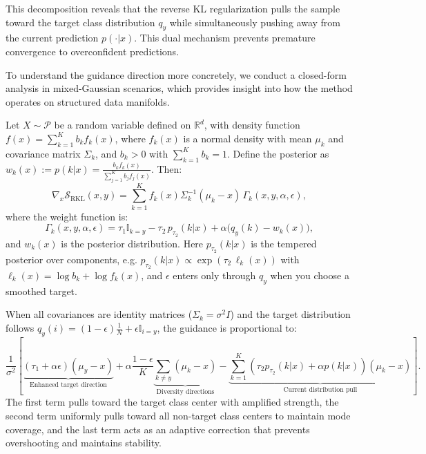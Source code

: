 \documentclass{article}
\begin{document}
This decomposition reveals that the reverse KL regularization pulls the sample toward the target class distribution $q_y$ while simultaneously pushing away from the current prediction $p(\cdot|x)$. This dual mechanism prevents premature convergence to overconfident predictions.

To understand the guidance direction more concretely, we conduct a closed-form analysis in mixed-Gaussian scenarios, which provides insight into how the method operates on structured data manifolds.

\begin{proposition}
\label{prop:gaussian_rkl}
Let $X \sim \mathcal{P}$ be a random variable defined on $\mathbb{R}^d$, with density function
$f(x) = \sum_{k=1}^K b_k f_k(x)$, where $f_k(x)$ is a normal density with mean $\mu_k$ and covariance matrix
$\Sigma_k$, and $b_k > 0$ with $\sum_{k=1}^K b_k = 1$.
Define the posterior as $w_k(x) := p(k|x)=\frac{b_k f_k(x)}{\sum_{j=1}^K b_j f_j(x)}$. Then:
\begin{equation}
\nabla_x \mathcal{S}_{\text{RKL}}(x, y) = \sum_{k=1}^K f_k(x)\Sigma_k^{-1}(\mu_k - x)\, \Gamma_k(x, y, \alpha, \epsilon),
\label{eq:gaussian_rkl}
\end{equation}
where the weight function is:
\begin{equation}
\Gamma_k(x, y, \alpha, \epsilon)
= \tau_1 \mathbb{I}_{k=y}
- \tau_2\, p_{\tau_2}(k|x)
+ \alpha\big(q_y(k) - w_k(x)\big),
\label{eq:gamma_weight}
\end{equation}
and 
$
w_k(x)
$ is the posterior distribution. Here $p_{\tau_2}(k|x)$ is the tempered posterior over components, e.g.
$p_{\tau_2}(k|x)\propto \exp(\tau_2\,\ell_k(x))$ with $\ell_k(x)=\log b_k+\log f_k(x)$,
and $\epsilon$ enters only through $q_y$ when you choose a smoothed target.
\end{proposition}

\begin{remark}
\label{rem:identity_covariance}
When all covariances are identity matrices ($\Sigma_k = \sigma^2 I$) and the target distribution follows $q_y(i) = (1-\epsilon)\frac{1}{N} + \epsilon \mathbb{I}_{i=y}$, the guidance is proportional to:
\begin{equation}
\frac{1}{\sigma^2}\left[\underbrace{(\tau_1 + \alpha\epsilon)(\mu_y - x)}_{\text{Enhanced target direction}} + \alpha\frac{1-\epsilon}{K}\underbrace{\sum_{k \neq y}(\mu_k - x)}_{\text{Diversity directions}} - \underbrace{\sum_{k=1}^K (\tau_2 p_{\tau_2}(k|x) + \alpha p(k|x))(\mu_k - x)}_{\text{Current distribution pull}}\right].
\label{eq:identity_rkl}
\end{equation}
The first term pulls toward the target class center with amplified strength, the second term uniformly pulls toward all non-target class centers to maintain mode coverage, and the last term acts as an adaptive correction that prevents overshooting and maintains stability.
\end{remark}
\end{document}
